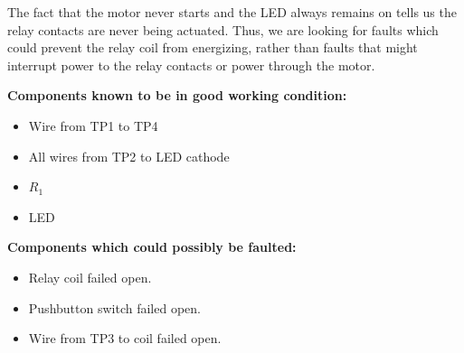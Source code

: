 
The fact that the motor never starts and the LED always remains on tells us the relay contacts are never being actuated.  Thus, we are looking for faults which could prevent the relay coil from energizing, rather than faults that might interrupt power to the relay contacts or power through the motor.

\vskip 10pt

\goodbreak
\noindent
{\bf Components known to be in good working condition:}

\begin{itemize}
\item{} Wire from TP1 to TP4
\item{} All wires from TP2 to LED cathode
\item{} $R_1$
\item{} LED
\end{itemize}

\vskip 10pt

\goodbreak
\noindent
{\bf Components which could possibly be faulted:}

\begin{itemize}
\item{} Relay coil failed open.
\item{} Pushbutton switch failed open.
\item{} Wire from TP3 to coil failed open.
\end{itemize}




